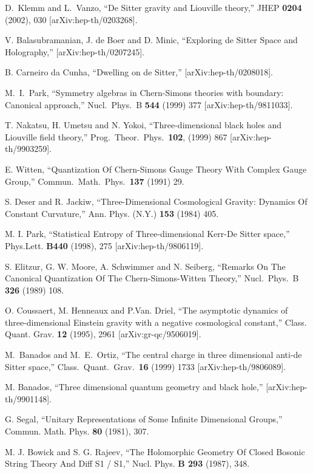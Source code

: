 \documentclass[a4paper,11pt]{article}
\begin{document}
\begin{thebibliography}{99}
D.~Klemm and L.~Vanzo,
``De Sitter gravity and Liouville theory,''
JHEP {\bf 0204} (2002), 030
[arXiv:hep-th/0203268].

V. Balasubramanian, J. de Boer and D. Minic,
``Exploring de Sitter Space and Holography,''
[arXiv:hep-th/0207245].

B. Carneiro da Cunha,
``Dwelling on de Sitter,''
[arXiv:hep-th/0208018].


M.~I.~Park,
``Symmetry algebras in Chern-Simons theories with boundary: 
Canonical  approach,''
Nucl.\ Phys.\ B {\bf 544} (1999) 377
[arXiv:hep-th/9811033].

T. Nakatsu, H. Umetsu and N. Yokoi,
``Three-dimensional black holes and Liouville field theory,''
Prog.\ Theor.\ Phys.\  {\bf 102}, (1999) 867
[arXiv:hep-th/9903259].

E. Witten,
``Quantization Of Chern-Simons Gauge Theory With Complex Gauge Group,''
Commun.\ Math.\ Phys.\  {\bf 137} (1991) 29.

S. Deser and R. Jackiw,
``Three-Dimensional Cosmological Gravity: Dynamics Of Constant Curvature,''
Ann. Phys. (N.Y.)  {\bf 153} (1984) 405.

M. I. Park, 
``Statistical Entropy of Three-dimensional Kerr-De Sitter space,''
Phys.Lett. {\bf B440} (1998), 275 [arXiv:hep-th/9806119].

S. Elitzur, G. W. Moore, A. Schwimmer and N. Seiberg,
``Remarks On The Canonical Quantization Of The Chern-Simons-Witten Theory,''
Nucl.\ Phys.\ B {\bf 326} (1989) 108.

O. Coussaert, M. Henneaux and P.Van. Driel, 
``The asymptotic dynamics of three-dimensional Einstein gravity 
with a negative cosmological constant,''
Class. Quant. Grav. {\bf 12} (1995), 2961 [arXiv:gr-qc/9506019]. 
 
M.~Banados and M.~E.~Ortiz,
``The central charge in three dimensional anti-de Sitter space,''
Class.\ Quant.\ Grav.\  {\bf 16} (1999) 1733
[arXiv:hep-th/9806089].


M. Banados, 
``Three dimensional quantum geometry and black hole,''
[arXiv:hep-th/9901148]. 

G. Segal,
``Unitary Representations of Some Infinite Dimensional Groups,''
Commun. Math. Phys. {\bf 80} (1981), 307.

M. J. Bowick and S. G. Rajeev,
``The Holomorphic Geometry Of Closed Bosonic String Theory And Diff S1 / S1,''
Nucl. Phys. {\bf B 293} (1987), 348.


\end{thebibliography}
\end{document}
